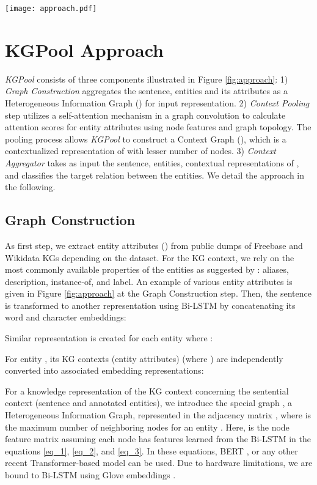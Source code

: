 \documentclass[11pt,a4paper]{article}
\begin{document}
\begin{figure*}
	\centering
	\texttt{[image: approach.pdf]}
	\caption{\textit{KGPool} approach has three components to supplement sentential context with necessary KG context.}
\label{fig:approach}
	    \vspace{-2mm}
	\end{figure*}



\section{KGPool Approach} \label{sec:approach}
\textit{KGPool} consists of three components illustrated in Figure \ref{fig:approach}: 1) \textit{Graph Construction} aggregates the sentence, entities and its attributes as a Heterogeneous Information Graph () for input representation.
2) \textit{Context Pooling} step utilizes a self-attention mechanism in a graph convolution to calculate attention scores for entity attributes using node features and graph topology. The pooling process allows \textit{KGPool} to construct a Context Graph (), which is a contextualized representation of  with lesser number of nodes.
3) \textit{Context Aggregator} takes as input the sentence, entities, contextual representations of , and classifies the target relation between the entities.
We detail the approach in the following.
\subsection{Graph Construction} \label{sec:graph_construction}
As first step, we extract entity attributes () from public dumps of Freebase \cite{DBLP:conf/aaai/BollackerCT07} and Wikidata \cite{DBLP:conf/www/Vrandecic12} KGs depending on the dataset. For the KG context, we rely on the most commonly available properties of the entities as suggested by \cite{bastos2020recon}: aliases, description, instance-of, and label. An example of various entity attributes is given in Figure \ref{fig:approach} at the Graph Construction step. 
Then, the sentence  is transformed to another representation using Bi-LSTM \cite{schuster1997bidirectional} by concatenating its word and character embeddings: 

Similar representation is created for each entity  where :

For entity , its KG contexts (entity attributes)  (where ) are independently converted into associated embedding representations:

For a knowledge representation of the KG context concerning the sentential context (sentence and annotated entities), we introduce the special graph , a Heterogeneous Information Graph, represented in the adjacency matrix , where  is the maximum number of neighboring nodes for an entity .
Here,  is the node feature matrix 
assuming each node has  features learned from the Bi-LSTM in the equations \ref{eq_1}, \ref{eq_2}, and \ref{eq_3}. In these equations, BERT \cite{devlin2019bert}, or any other recent Transformer-based model can be used. Due to hardware limitations, we are bound to Bi-LSTM using Glove embeddings \cite{pennington2014glove}.
\end{document}
